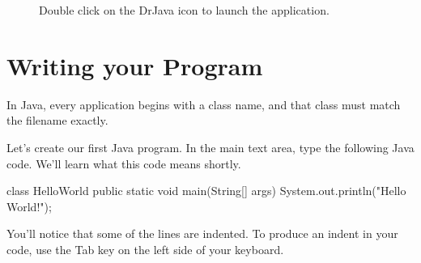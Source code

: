 \begin{figure}
    \centering
    \caption{Double click on the DrJava icon to launch the application.}
    \label{fig:drjava_linenumbers}
\end{figure}

\section{Writing your Program}

In Java, every application begins with a class name, and that class must match the filename exactly.

Let's create our first Java program. In the main text area, type the following Java code. We'll learn what this code means shortly.
\begin{code}
class HelloWorld {
    public static void main(String[] args) {
        System.out.println("Hello World!");
    }
}
\end{code}
You'll notice that some of the lines are indented. To produce an indent in your code, use the Tab key on the left side of your keyboard.

